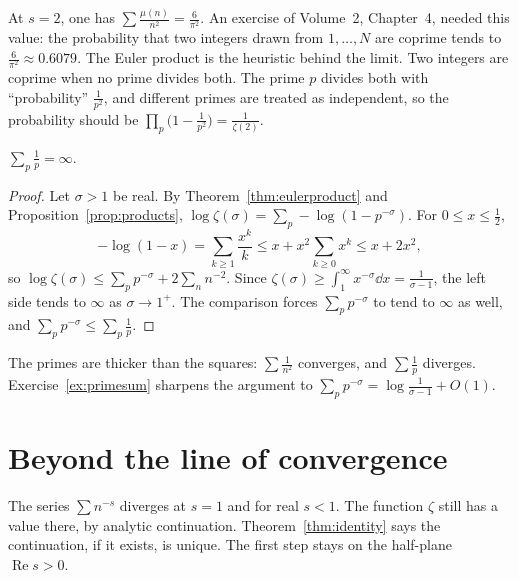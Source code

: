 At $s=2$, one has $\sum\frac{\mu(n)}{n^2}=\frac6{\pi^2}$. An exercise of Volume~2, Chapter~4, needed this value: the probability that two integers drawn from $1,\ldots,N$ are coprime tends to $\frac6{\pi^2}\approx0.6079$. The Euler product is the heuristic behind the limit. Two integers are coprime when no prime divides both. The prime $p$ divides both with ``probability'' $\frac1{p^2}$, and different primes are treated as independent, so the probability should be $\prod_p\bigl(1-\frac1{p^2}\bigr)=\frac1{\zeta(2)}$.

\begin{corollary}[Euler, 1737]\label{cor:primesdiverge}
$\displaystyle\sum_p\frac1p=\infty$.
\end{corollary}
\begin{proof}
Let $\sigma>1$ be real. By Theorem~\ref{thm:eulerproduct} and Proposition~\ref{prop:products}, $\log\zeta(\sigma)=\sum_p-\log(1-p^{-\sigma})$. For $0\le x\le\frac12$,
\[
-\log(1-x)=\sum_{k\ge1}\frac{x^k}k\le x+x^2\sum_{k\ge0}x^k\le x+2x^2,
\]
so $\log\zeta(\sigma)\le\sum_pp^{-\sigma}+2\sum_nn^{-2}$. Since $\zeta(\sigma)\ge\int_1^\infty x^{-\sigma}\dd x=\frac1{\sigma-1}$, the left side tends to $\infty$ as $\sigma\to1^+$. The comparison forces $\sum_pp^{-\sigma}$ to tend to $\infty$ as well, and $\sum_pp^{-\sigma}\le\sum_p\frac1p$.
\end{proof}

The primes are thicker than the squares: $\sum\frac1{n^2}$ converges, and $\sum\frac1p$ diverges. Exercise~\ref{ex:primesum} sharpens the argument to $\sum_pp^{-\sigma}=\log\frac1{\sigma-1}+O(1)$.

\section{Beyond the line of convergence}

The series $\sum n^{-s}$ diverges at $s=1$ and for real $s<1$. The function $\zeta$ still has a value there, by analytic continuation. Theorem~\ref{thm:identity} says the continuation, if it exists, is unique. The first step stays on the half-plane $\operatorname{Re}s>0$.

